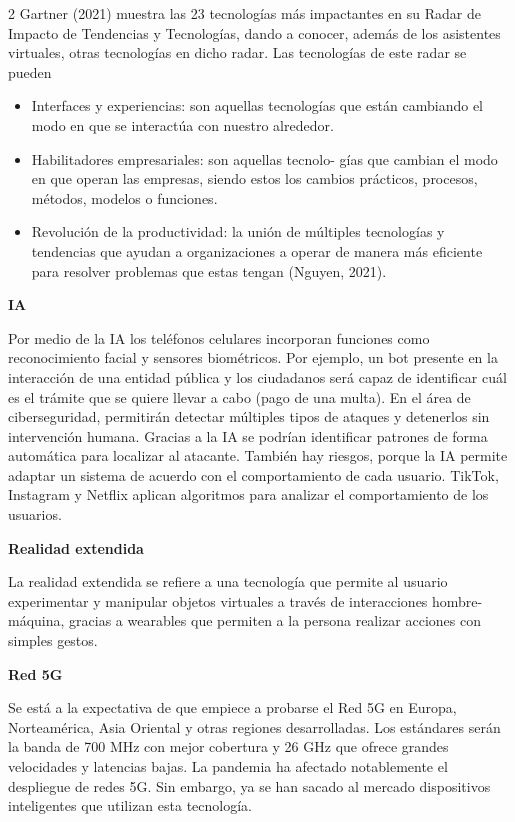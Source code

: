 \documentclass[12pt,spanish,Letterpaper,openany]{book}
\begin{document}
\begin {multicols}{2}
Gartner (2021) muestra las 23 tecnologías más impactantes en su Radar de Impacto de Tendencias y Tecnologías, dando a conocer, además de los asistentes virtuales, otras tecnologías en dicho radar. Las tecnologías de este radar se pueden

\begin{itemize}
\item
  Interfaces y experiencias: son aquellas tecnologías que están cambiando el modo en que se interactúa con nuestro alrededor.
\item
  Habilitadores empresariales: son aquellas tecnolo-
  gías que cambian el modo en que operan las empresas, siendo estos los cambios prácticos, procesos, métodos, modelos o funciones.
\item
  Revolución de la productividad: la unión de múltiples tecnologías y tendencias que ayudan a organizaciones a operar de manera más eficiente para resolver problemas que estas tengan (Nguyen, 2021).
\end{itemize}

\textbf{IA}

Por medio de la IA los teléfonos celulares incorporan funciones como reconocimiento facial y sensores biométricos. Por ejemplo, un bot presente en la interacción de una entidad pública y los ciudadanos será capaz de identificar cuál es el trámite que se quiere llevar a cabo (pago de una multa).
En el área de ciberseguridad, permitirán detectar múltiples tipos de ataques y detenerlos sin intervención humana. Gracias a la IA se podrían identificar patrones de forma automática para localizar al atacante.
También hay riesgos, porque la IA permite adaptar un sistema de acuerdo con el comportamiento de cada usuario. TikTok, Instagram y Netflix aplican algoritmos para analizar el comportamiento de los usuarios.

\textbf{Realidad extendida}

La realidad extendida se refiere a una tecnología que permite al usuario experimentar y manipular objetos virtuales a través de interacciones hombre-máquina, gracias a wearables que permiten a la persona realizar acciones con simples gestos.

\textbf{Red 5G}

Se está a la expectativa de que empiece a probarse el Red 5G en Europa, Norteamérica, Asia Oriental y otras regiones desarrolladas. Los estándares serán la banda de 700 MHz con mejor cobertura y 26 GHz que ofrece grandes velocidades y latencias bajas.
La pandemia ha afectado notablemente el despliegue de redes 5G. Sin embargo, ya se han sacado al mercado dispositivos inteligentes que utilizan esta tecnología.


\end{multicols}
\end{document}
